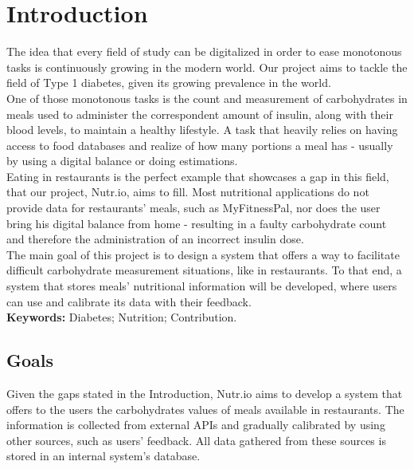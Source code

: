 \documentclass{article}
\begin{document}
\section{Introduction}

The idea that every field of study can be digitalized in order to ease monotonous tasks is continuously growing in the modern world. Our project aims to tackle the field of Type 1 diabetes, given its growing prevalence in the world\cite{world}.\\

One of those monotonous tasks is the count and measurement of carbohydrates in meals used to administer the correspondent amount of insulin, along with their blood levels, to maintain a healthy lifestyle. A task that heavily relies on having access to food databases\cite{idf} and realize of how many portions a meal has - usually by using a digital balance or doing estimations.\\

Eating in restaurants is the perfect example that showcases a gap in this field, that our project, 
Nutr.io, aims to fill.  Most nutritional applications do not provide data for restaurants' meals, such as MyFitnessPal\cite{myfitnesspal}, nor does the user bring his digital balance from home - resulting in a faulty carbohydrate count and therefore the administration of an incorrect insulin dose.\\

The main goal of this project is to design a system that offers a way to facilitate difficult carbohydrate measurement situations, like in restaurants. To that end, a system that stores meals' nutritional information will be developed, where users can use and calibrate its data with their feedback.\\

\textbf{Keywords:} Diabetes; Nutrition; Contribution.

\subsection{Goals}

Given the gaps stated in the Introduction, Nutr.io aims to develop a system that offers to the users the carbohydrates values of meals available in restaurants. The information is collected from external APIs and gradually calibrated by using other sources, such as users' feedback. All data gathered from these sources is stored in an internal system's database.\\
\end{document}
